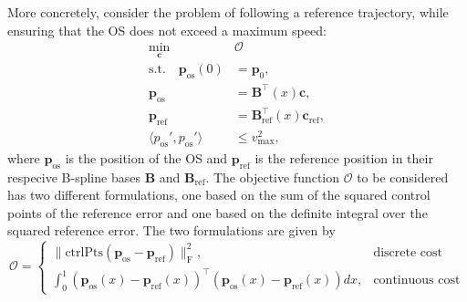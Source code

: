 More concretely, consider the problem of following a reference trajectory, while ensuring that the OS does not exceed a maximum speed:
\begin{equation}\label{eq:conservativeness-optimization}
    \begin{aligned}
        \min_{\mathbf c} \quad & \mathcal{O} \\
        \text{s.t.} \quad \mathbf p_\text{os}(0) &= \mathbf p_0, \\
                     \mathbf p_\text{os} &= \mathbf B^\top(x) \mathbf c, \\
                     \mathbf p_\text{ref} &= \mathbf B_\text{ref}^\top(x) \mathbf c_\text{ref}, \\
                     \langle p_\text{os}', p_\text{os}' \rangle &\le v_\text{max}^2,
    \end{aligned}
\end{equation}
where $\mathbf p_\text{os}$ is the position of the OS and $\mathbf p_\text{ref}$ is the reference position in their respecive B-spline bases $\mathbf B$ and $\mathbf B_\text{ref}$. The objective function $\mathcal{O}$ to be considered has two different formulations, one based on the sum of the squared control points of the reference error and one based on the definite integral over the squared reference error. The two formulations are given by
\begin{equation}\label{eq:conservativeness-objective}
    \mathcal{O} = \begin{cases}
        \|\text{ctrlPts}(\mathbf p_\text{os} - \mathbf p_\text{ref})\|_\text{F}^2, & \text{discrete cost} \\
        \int_0^1 \left(\mathbf p_\text{os}(x) - \mathbf p_\text{ref}(x)\right)^\top \left(\mathbf p_\text{os}(x) - \mathbf p_\text{ref}(x)\right) dx, & \text{continuous cost}
    \end{cases}
\end{equation}



